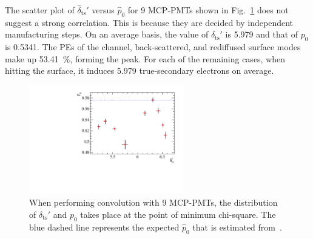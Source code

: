 The scatter plot of $\hat{\delta}_{\mathrm{ts}}'$ versus $\hat{p}_0$ for 9 MCP-PMTs shown in Fig.~\ref{fig:true_p} does not suggest a strong correlation. This is because they are decided by independent manufacturing steps. On an average basis, the value of $\delta_{\mathrm{ts}}'$ is 5.979 and that of $p_0$ is 0.5341. %
The PEs of the channel, back-scattered, and rediffused surface modes make up \SI{53.41}{\percent}, forming the peak. For each of the remaining cases, when hitting the surface, it induces 5.979 true-secondary electrons on average.
\begin{figure}[!htbp]
	\centering
	\includegraphics[width=0.6\textwidth]{PMTRelated/GTmodel/true_p.pdf}
	\caption{When performing convolution with 9 MCP-PMTs, the distribution of $\delta_{\mathrm{ts}}'$ and $p_0$ takes place at the point of minimum chi-square. The blue dashed line represents the expected $\hat{p}_0$ that is estimated from~\cite{chen2018photoelectron}. }
	\label{fig:true_p}
\end{figure}

